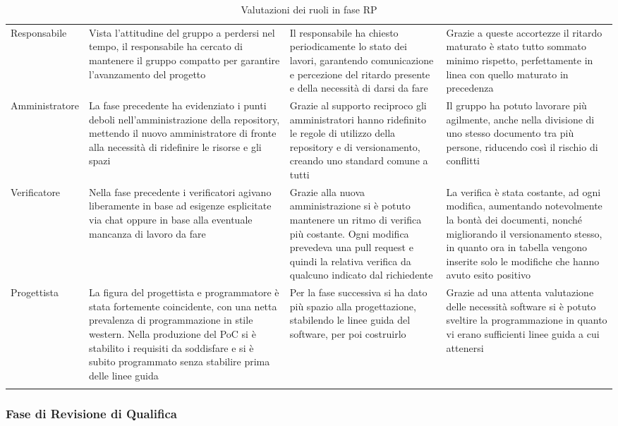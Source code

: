 \documentclass[../piano_di_qualifica.tex]{subfiles}
\begin{document}
\begin{center}
\begin{longtable}{|p{2.5cm}|p{4.5cm}|p{4.5cm}|p{4.5cm}|}
		Responsabile & Vista l’attitudine del gruppo a perdersi nel tempo, il responsabile ha cercato di mantenere il gruppo compatto per garantire l’avanzamento del progetto & Il responsabile ha chiesto periodicamente lo stato dei lavori, garantendo comunicazione e percezione del ritardo presente e della necessità di darsi da fare & Grazie a queste accortezze il ritardo maturato è stato tutto sommato minimo rispetto, perfettamente in linea con quello maturato in precedenza \\
		Amministratore & La fase precedente ha evidenziato i punti deboli nell’amministrazione della repository, mettendo il nuovo amministratore di fronte alla necessità di ridefinire le risorse e gli spazi & Grazie al supporto reciproco gli amministratori hanno ridefinito le regole di utilizzo della repository e di versionamento, creando uno standard comune a tutti & Il gruppo ha potuto lavorare più agilmente, anche nella divisione di uno stesso documento tra più persone, riducendo così il rischio di conflitti  \\
		Verificatore & Nella fase precedente i verificatori agivano liberamente in base ad esigenze esplicitate via chat oppure in base alla eventuale mancanza di lavoro da fare & Grazie alla nuova amministrazione si è potuto mantenere un ritmo di verifica più costante. Ogni modifica prevedeva una pull request e quindi la relativa verifica da qualcuno indicato dal richiedente & La verifica è stata costante, ad ogni modifica, aumentando notevolmente la bontà dei documenti, nonché migliorando il versionamento stesso, in quanto ora in tabella vengono inserite solo le modifiche che hanno avuto esito positivo \\
		Progettista & La figura del progettista e programmatore è stata fortemente coincidente, con una netta prevalenza di programmazione in stile western. Nella produzione del PoC si è stabilito i requisiti da soddisfare e si è subito programmato senza stabilire prima delle linee guida & Per la fase successiva si ha dato più spazio alla progettazione, stabilendo le linee guida del software, per poi costruirlo & Grazie ad una attenta valutazione delle necessità software si è potuto sveltire la programmazione in quanto vi erano sufficienti linee guida a cui attenersi \\

		\hline
		\rowcolor{white}
		\caption{Valutazioni dei ruoli in fase RP}
	\end{longtable}
\end{center}

\subsubsection{Fase di Revisione di Qualifica}
\end{document}

